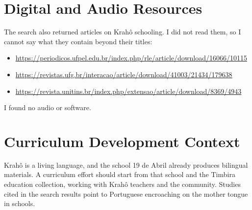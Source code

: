 \documentclass[12pt]{article}
\begin{document}
\section{Digital and Audio Resources}
The search also returned articles on Krah\^o schooling. I did not read them, so I cannot say what they contain beyond their titles:
\begin{itemize}
\item \url{https://periodicos.ufpel.edu.br/index.php/rle/article/download/16066/10115}
\item \url{https://revistas.ufg.br/interacao/article/download/41003/21434/179638}
\item \url{https://revista.unitins.br/index.php/extensao/article/download/8369/4943}
\end{itemize}
I found no audio or software.

\section{Curriculum Development Context}
Krah\^o is a living language, and the school 19 de Abril already produces bilingual materials. A curriculum effort should start from that school and the Timbira education collection, working with Krah\^o teachers and the community. Studies cited in the search results point to Portuguese encroaching on the mother tongue in schools.
\end{document}
